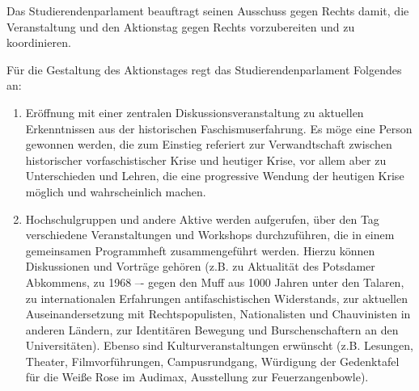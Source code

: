 \documentclass[ngerman,headheight=70pt]{scrartcl}
\begin{document}
    Das Studierendenparlament beauftragt seinen Ausschuss gegen Rechts damit, die
    Veranstaltung und den Aktionstag gegen Rechts vorzubereiten und zu koordinieren.

    Für die Gestaltung des Aktionstages regt das Studierendenparlament Folgendes an:

    \begin{enumerate}
        \item Eröffnung mit einer zentralen Diskussionsveranstaltung zu aktuellen
        Erkenntnissen aus der historischen Faschismuserfahrung. Es möge eine Person
        gewonnen werden, die zum Einstieg referiert zur Verwandtschaft zwischen
        historischer vorfaschistischer Krise und heutiger Krise, vor allem aber
        zu Unterschieden und Lehren, die eine progressive Wendung der heutigen
         Krise möglich und wahrscheinlich machen.

        \item Hochschulgruppen und andere Aktive werden aufgerufen, über den Tag
        verschiedene Veranstaltungen und Workshops durchzuführen, die in einem
        gemeinsamen Programmheft zusammengeführt werden. Hierzu können Diskussionen
        und Vorträge gehören (z.B. zu Aktualität des Potsdamer Abkommens, zu
        1968 –- gegen den Muff aus 1000 Jahren unter den Talaren, zu internationalen
        Erfahrungen antifaschistischen Widerstands, zur aktuellen Auseinandersetzung
        mit Rechtspopulisten, Nationalisten und Chauvinisten in anderen Ländern,
        zur Identitären Bewegung und Burschenschaftern an den Universitäten).
        Ebenso sind Kulturveranstaltungen erwünscht (z.B. Lesungen, Theater,
        Filmvorführungen, Campusrundgang, Würdigung der Gedenktafel für die
        Weiße Rose im Audimax, Ausstellung zur Feuerzangenbowle). 
    \end{enumerate}
\end{document}
